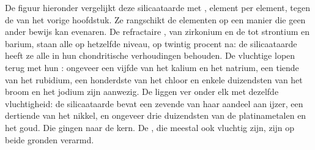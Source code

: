 De figuur hieronder vergelijkt deze silicaataarde met , element per
element, tegen de  van het vorige hoofdstuk. Ze rangschikt
de elementen op een manier die geen ander bewijs kan evenaren. De refractaire , van zirkonium en de  tot strontium en barium, staan
alle op hetzelfde niveau, op twintig procent na: de silicaataarde
heeft ze alle in hun chondritische verhoudingen behouden. De vluchtige 
lopen terug met hun : ongeveer een vijfde van het kalium
en het natrium, een tiende van het rubidium, een honderdste van het chloor en enkele
duizendsten van het broom en het jodium zijn aanwezig. De  liggen ver onder elk 
met dezelfde vluchtigheid: de silicaataarde bevat een zevende van haar aandeel aan
ijzer, een dertiende van het nikkel, en ongeveer drie duizendsten van de
platinametalen en het goud. Die gingen naar de kern. De , die meestal ook vluchtig zijn, zijn op beide gronden verarmd.

